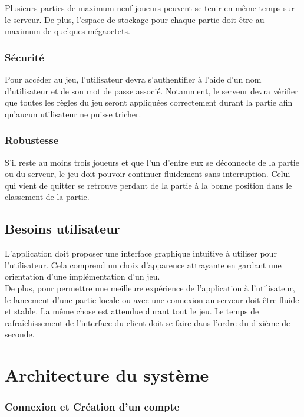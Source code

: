 \documentclass{article}
\begin{document}
Plusieurs parties de maximum neuf joueurs peuvent se tenir en même temps sur le serveur. De plus, l'espace de stockage pour chaque partie doit être au maximum de quelques mégaoctets.

\subsubsection{Sécurité}


Pour accéder au jeu, l'utilisateur devra s'authentifier à l'aide d'un nom d'utilisateur et de son mot de passe associé. Notamment, le serveur devra vérifier que toutes les règles du jeu seront appliquées correctement durant la partie afin qu'aucun utilisateur ne puisse tricher. 

\subsubsection{Robustesse}

S'il reste au moins trois joueurs et que l'un d'entre eux se déconnecte de la partie ou du serveur, le jeu doit pouvoir continuer fluidement sans interruption. Celui qui vient de quitter se retrouve perdant de la partie à la bonne position dans le classement de la partie.

\subsection{Besoins utilisateur}

L'application doit proposer une interface graphique intuitive à utiliser pour l'utilisateur. Cela comprend un choix d'apparence attrayante en gardant une orientation d'une implémentation d'un jeu.\\
 De plus, pour permettre une meilleure expérience de l'application à l'utilisateur, le lancement d'une partie locale ou avec une connexion au serveur doit être fluide et stable. La même chose est attendue durant tout le jeu. Le temps de rafraîchissement de l'interface du client doit se faire dans l'ordre du dixième de seconde.

\newpage

\section{Architecture du système}

\subsubsection{Connexion et Création d'un compte}
\end{document}
